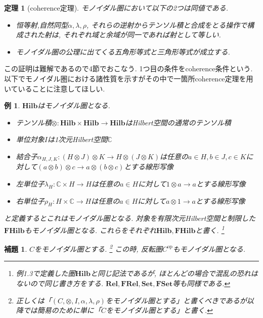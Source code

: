 \documentclass[a4paper,12pt]{ltjsarticle}
\theoremstyle{break}
\newtheorem{lem}[thm]{補題}
\newtheorem{thrm}[thm]{定理}
\newtheorem{eg}[thm]{例}
\newcommand{\cset}{\mathbf{Set}}
\newcommand{\fset}{\mathbf{FSet}}
\newcommand{\rel}{\mathbf{Rel}}
\newcommand{\frel}{\mathbf{FRel}}
\newcommand{\hilb}{\mathbf{Hilb}}
\newcommand{\fhilb}{\mathbf{FHilb}}
\newcommand{\mbc}{\mathbb{C}}
\newcommand{\Op}{\mathrm{op}}
\newcommand{\al}{\alpha}
\newcommand{\la}{\lambda}
\newcommand{\ot}{\otimes}
\newcommand{\ti}{\times}
\numberwithin{equation}{section}
\begin{document}
\begin{thrm}[coherence定理]
  モノイダル圏において以下の2つは同値である. 
  \begin{itemize}
    \item 恒等射,自然同型$\al,\la,\rho$, それらの逆射からテンソル積と合成をとる操作で構成された射は, それぞれ域と余域が同一であれば射として等しい. 
    \item モノイダル圏の公理に出てくる五角形等式と三角形等式が成立する. 
  \end{itemize}
\end{thrm}

この証明は難解であるので4節でおこなう. 
1つ目の条件をcoherence条件という. 
以下でモノイダル圏における諸性質を示すがその中で一箇所coherence定理を用いていることに注意してほしい. 

\begin{eg}
  $\hilb$はモノイダル圏となる. 
  \begin{itemize}
    \item テンソル積$\ot : \hilb \ti \hilb \to \hilb$はHilbert空間の通常のテンソル積
    \item 単位対象$I$は1次元Hilbert空間$\mbc$
    \item 結合子$\al_{H,J,K}: (H \ot J) \ot K \to H \ot (J \ot K)$は任意の$a \in H, b \in J, c \in K$に対して$(a \ot b) \ot c \to a \ot (b \ot c)$とする線形写像
    \item 左単位子$\la_H: \mbc \ti H \to H$は任意の$a \in H$に対して$1 \ot a \to a$とする線形写像
    \item 右単位子$\rho_H: H \ti \mbc  \to H$は任意の$a \in H$に対して$a \ot 1 \to a$とする線形写像
  \end{itemize}
  と定義するとこれはモノイダル圏となる. 
  対象を有限次元Hilbert空間と制限した$\fhilb$もモノイダル圏となる. 
  これらをそれぞれ$\hilb, \fhilb$と書く. 
  \footnote{
      例1.3で定義した圏$\hilb$と同じ記法であるが, ほとんどの場合で混乱の恐れはないので同じ書き方をする. 
      $\rel, \frel, \cset, \fset$等も同様である. 
    } 
\end{eg} 


\begin{lem}
  $C$をモノイダル圏とする.
  \footnote{
    正しくは「$(C,\ot,I,\al,\la,\rho)$をモノイダル圏とする」と書くべきであるが以降では簡易のために単に「$C$をモノイダル圏とする」と書く. 
  } 
  この時, 反転圏$C^{\Op}$もモノイダル圏となる. 
\end{lem}
\end{document}
